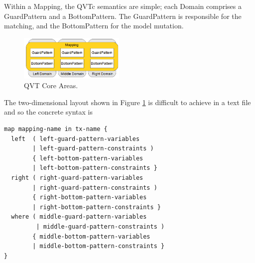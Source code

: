 




Within a Mapping, the QVTc semantics are simple; each Domain comprises a GuardPattern and a BottomPattern. The GuardPattern is responsible for the matching, and the BottomPattern for the model mutation. 

\begin{figure}[h]
	\centering
	\includegraphics[width=0.45\textwidth]{QVTcoreAreas.png}
	\caption{QVT Core Areas.}
	\label{fig:QVTCoreAreas}
\end{figure}

The two-dimensional layout shown in Figure \ref{fig:QVTCoreAreas} is difficult to achieve in a text file and so the concrete syntax is

{\scriptsize \begin{verbatim}
map mapping-name in tx-name {
  left  ( left-guard-pattern-variables
        | left-guard-pattern-constraints )
        { left-bottom-pattern-variables
        | left-bottom-pattern-constraints }
  right ( right-guard-pattern-variables
        | right-guard-pattern-constraints )
        { right-bottom-pattern-variables
        | right-bottom-pattern-constraints }
  where ( middle-guard-pattern-variables
         | middle-guard-pattern-constraints )
        { middle-bottom-pattern-variables
        | middle-bottom-pattern-constraints }
}
\end{verbatim}}

